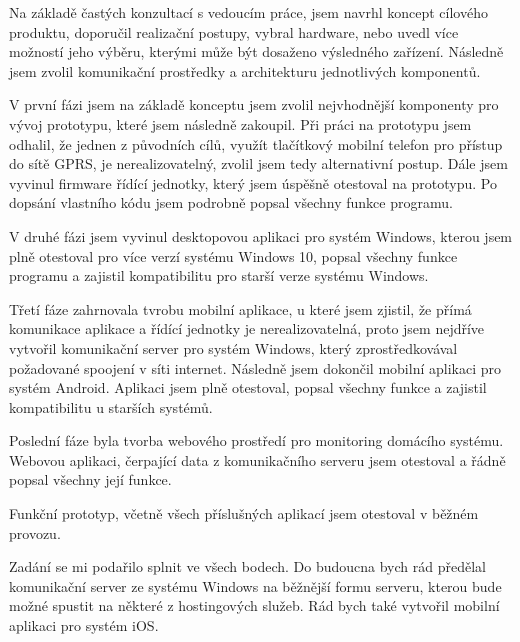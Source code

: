 \documentclass[FM,DP]{tulthesis}  %
\begin{document}
Na základě častých konzultací s vedoucím práce, jsem navrhl koncept cílového produktu, doporučil realizační postupy, vybral hardware, nebo uvedl více možností jeho výběru, kterými může být dosaženo výsledného zařízení. Následně jsem zvolil komunikační prostředky a architekturu jednotlivých komponentů.

V první fázi jsem na základě konceptu jsem zvolil nejvhodnější komponenty pro vývoj prototypu, které jsem následně zakoupil. Při práci na prototypu jsem odhalil, že jednen z původních cílů, využít tlačítkový mobilní telefon pro přístup do sítě GPRS, je nerealizovatelný, zvolil jsem tedy alternativní postup. Dále jsem vyvinul firmware řídící jednotky, který jsem úspěšně otestoval na prototypu. Po dopsání vlastního kódu jsem podrobně popsal všechny funkce programu.

V druhé fázi jsem vyvinul desktopovou aplikaci pro systém Windows, kterou jsem plně otestoval pro více verzí systému Windows 10, popsal všechny funkce programu a zajistil kompatibilitu pro starší verze systému Windows.

Třetí fáze zahrnovala tvrobu mobilní aplikace, u které jsem zjistil, že přímá komunikace aplikace a řídící jednotky je nerealizovatelná, proto jsem nejdříve vytvořil komunikační server pro systém Windows, který zprostředkovával požadované spoojení v síti internet. Následně jsem dokončil mobilní aplikaci pro systém Android. Aplikaci jsem plně otestoval, popsal všechny funkce a zajistil kompatibilitu u starších systémů.

Poslední fáze byla tvorba webového prostředí pro monitoring domácího systému. Webovou aplikaci, čerpající data z komunikačního serveru jsem otestoval a řádně popsal všechny její funkce.

Funkční prototyp, včetně všech příslušných aplikací jsem otestoval v běžném provozu.

Zadání se mi podařilo splnit ve všech bodech. Do budoucna bych rád předělal komunikační server ze systému Windows na běžnější formu serveru, kterou bude možné spustit na některé z hostingových služeb. Rád bych také vytvořil mobilní aplikaci pro systém iOS.


\end{document}
